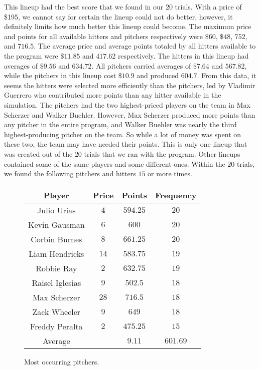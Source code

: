 This lineup had the best score that we found in our $20$ trials. With a price of \$195, we cannot say for certain the lineup could not do better, however, it definitely limits how much better this lineup could become. 
\newline\indent The maximum price and points for all available hitters and pitchers respectively were $\$60$, $\$48$, $752$, and $716.5$. The average price and average points totaled by all hitters available to the program were $\$11.85$ and $417.62$ respectively. The hitters in this lineup had averages of $\$9.56$ and $634.72$. All pitchers carried averages of $\$7.64$ and $567.82$, while the pitchers in this lineup cost $\$10.9$ and produced $604.7$. From this data, it seems the hitters were selected more efficiently than the pitchers, led by Vladimir Guerrero who contributed more points than any hitter available in the simulation. The pitchers had the two highest-priced players on the team in Max Scherzer and Walker Buehler. However, Max Scherzer produced more points than any pitcher in the entire program, and Walker Buehler was nearly the third highest-producing pitcher on the team. So while a lot of money was spent on these two, the team may have needed their points. 
\newline\indent This is only one lineup that was created out of the $20$ trials that we ran with the program. Other lineups contained some of the same players and some different ones. Within the $20$ trials, we found the following pitchers and hitters $15$ or more times.


\begin{figure}[htb]
  \centering 
  \begin{tabular}{|c|c|c|c|} 
    \hline \hline 
    Player & Price & Points & Frequency \\ 
    \hline 
    Julio Urias & $4$ & $594.25$ & $20$ \\
    Kevin Gausman & $6$ & $600$ & 
    $20$ \\
    Corbin Burnes & $8$ & $661.25$ & $20$ \\
    Liam Hendricks & $14$ & $583.75$ & $19$ \\
    Robbie Ray & $2$ & $632.75$ & $19$ \\
    Raisel Iglesias & $9$ & $502.5$ & $18$ \\
    Max Scherzer & $28$ & $716.5$ & $18$ \\
    Zack Wheeler & $9$ & $649$ & $18$ \\
    Freddy Peralta & $2$ & $475.25$ & $15$ \\
    \hline 
    Average & & $9.11$ & $601.69$ \\
    \hline \hline
  \end{tabular}

  \caption{Most occurring pitchers.}
  \label{tab:example}

\end{figure}

